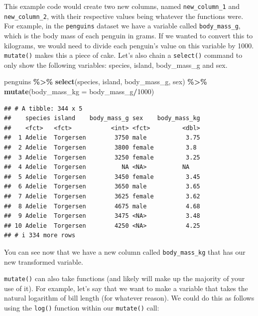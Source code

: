 \documentclass[
]{book}
\newenvironment{Shaded}{\begin{snugshade}}{\end{snugshade}}
\newcommand{\AttributeTok}[1]{\textcolor[rgb]{0.13,0.29,0.53}{#1}}
\newcommand{\DecValTok}[1]{\textcolor[rgb]{0.00,0.00,0.81}{#1}}
\newcommand{\FunctionTok}[1]{\textcolor[rgb]{0.13,0.29,0.53}{\textbf{#1}}}
\newcommand{\NormalTok}[1]{#1}
\newcommand{\SpecialCharTok}[1]{\textcolor[rgb]{0.81,0.36,0.00}{\textbf{#1}}}
\begin{document}
This example code would create two new columns, named \texttt{new\_column\_1} and \texttt{new\_column\_2}, with their respective values being whatever the functions were. For example, in the \texttt{penguins} dataset we have a variable called \texttt{body\_mass\_g}, which is the body mass of each penguin in grams. If we wanted to convert this to kilograms, we would need to divide each penguin's value on this variable by 1000. \texttt{mutate()} makes this a piece of cake. Let's also chain a \texttt{select()} command to only show the following variables: species, island, body\_mass\_g and sex.

\begin{Shaded}
\begin{Highlighting}[]
\NormalTok{penguins }\SpecialCharTok{\%\textgreater{}\%}
  \FunctionTok{select}\NormalTok{(species, island, body\_mass\_g, sex) }\SpecialCharTok{\%\textgreater{}\%}
  \FunctionTok{mutate}\NormalTok{(}\AttributeTok{body\_mass\_kg =}\NormalTok{ body\_mass\_g}\SpecialCharTok{/}\DecValTok{1000}\NormalTok{)}
\end{Highlighting}
\end{Shaded}

\begin{verbatim}
## # A tibble: 344 x 5
##    species island    body_mass_g sex    body_mass_kg
##    <fct>   <fct>           <int> <fct>         <dbl>
##  1 Adelie  Torgersen        3750 male           3.75
##  2 Adelie  Torgersen        3800 female         3.8 
##  3 Adelie  Torgersen        3250 female         3.25
##  4 Adelie  Torgersen          NA <NA>          NA   
##  5 Adelie  Torgersen        3450 female         3.45
##  6 Adelie  Torgersen        3650 male           3.65
##  7 Adelie  Torgersen        3625 female         3.62
##  8 Adelie  Torgersen        4675 male           4.68
##  9 Adelie  Torgersen        3475 <NA>           3.48
## 10 Adelie  Torgersen        4250 <NA>           4.25
## # i 334 more rows
\end{verbatim}

You can see now that we have a new column called \texttt{body\_mass\_kg} that has our new transformed variable.

\texttt{mutate()} can also take functions (and likely will make up the majority of your use of it). For example, let's say that we want to make a variable that takes the natural logarithm of bill length (for whatever reason). We could do this as follows using the \texttt{log()} function within our \texttt{mutate()} call:
\end{document}
